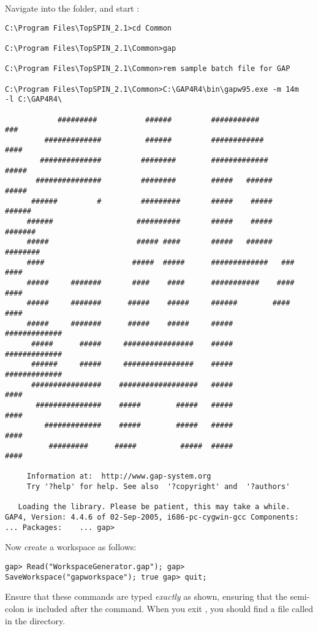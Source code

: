 Navigate into the  folder, and start \gap:
%
\begin{lstlisting}
C:\Program Files\TopSPIN_2.1>cd Common

C:\Program Files\TopSPIN_2.1\Common>gap

C:\Program Files\TopSPIN_2.1\Common>rem sample batch file for GAP

C:\Program Files\TopSPIN_2.1\Common>C:\GAP4R4\bin\gapw95.exe -m 14m
-l C:\GAP4R4\

            #########           ######         ###########           ###
         #############          ######         ############         ####
        ##############         ########        #############       #####
       ###############         ########        #####   ######      #####
      ######         #         #########       #####    #####     ######
     ######                   ##########       #####    #####    #######
     #####                    ##### ####       #####   ######   ########
     ####                    #####  #####      #############   ###  ####
     #####     #######       ####    ####      ###########    ####  ####
     #####     #######      #####    #####     ######        ####   ####
     #####     #######      #####    #####     #####         #############
      #####      #####     ################    #####         #############
      ######     #####     ################    #####         #############
      ################    ##################   #####                ####
       ###############    #####        #####   #####                ####
         #############    #####        #####   #####                ####
          #########      #####          #####  #####                ####

     Information at:  http://www.gap-system.org
     Try '?help' for help. See also  '?copyright' and  '?authors'

   Loading the library. Please be patient, this may take a while.
GAP4, Version: 4.4.6 of 02-Sep-2005, i686-pc-cygwin-gcc Components:
... Packages:    ... gap>
\end{lstlisting}
%
Now create a workspace as follows:
%
\begin{lstlisting}
gap> Read("WorkspaceGenerator.gap"); gap>
SaveWorkspace("gapworkspace"); true gap> quit;
\end{lstlisting}
%
Ensure that these commands are typed \emph{exactly} as shown,
ensuring that the semi-colon is included after the 
command.  When you exit \gap, you should find a file called
 in the  directory.
%
